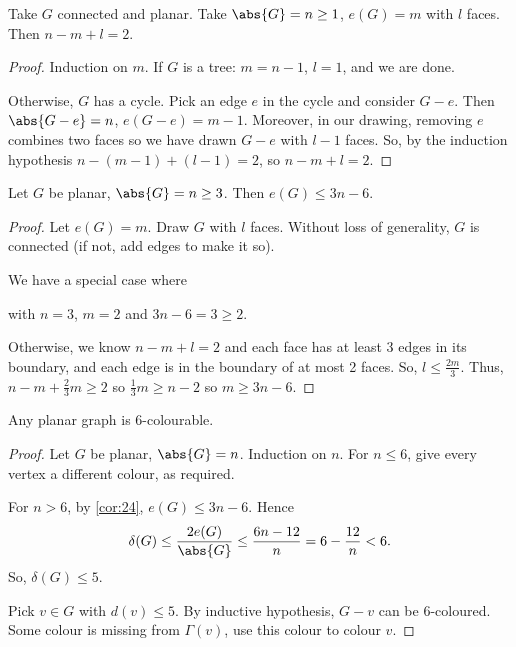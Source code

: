 \documentclass{article}
\begin{document}
\begin{nthm}\label{thm:23}
    Take $G$ connected and planar.
    Take $\abs{G} = n \geq 1$, $e(G) = m$ with $l$ faces.
    Then $n - m + l = 2$.
\end{nthm}
\begin{proof}
    Induction on $m$. If $G$ is a tree: $m = n-1$, $l = 1$, and we are done.

    Otherwise, $G$ has a cycle.
    Pick an edge $e$ in the cycle and consider $G-e$. Then $\abs{G - e} = n$, $e(G-e) = m-1$.
    Moreover, in our drawing, removing $e$ combines two faces so we have drawn $G-e$ with $l-1$ faces.
    So, by the induction hypothesis $n - (m-1) + (l-1) = 2$, so $n - m + l = 2$.
\end{proof}
\begin{ncor}\label{cor:24}
    Let $G$ be planar, $\abs{G} = n \geq 3$. Then $e(G) \leq 3n-6$.
\end{ncor}
\begin{proof}
    Let $e(G) = m$. Draw $G$ with $l$ faces.
    Without loss of generality, $G$ is connected (if not, add edges to make it so).

    We have a special case where
    \begin{center}
    \end{center}
    with $n = 3$, $m = 2$ and $3n-6 = 3 \geq 2$.

    Otherwise, we know $n - m + l = 2$ and each face has at least 3 edges in its boundary, and each edge is in the boundary of at most 2 faces.
    So, $l \leq \frac{2m}{3}$.
    Thus, $n -m + \frac{2}{3}m \geq 2$ so $\frac{1}{3}m \geq n-2$ so $m \geq 3n-6.$
\end{proof}
\begin{nprop}\label{prop:25}
    Any planar graph is 6-colourable.
\end{nprop}
\begin{proof}
    Let $G$ be planar, $\abs{G} = n$. Induction on $n$.
    For $n \leq 6$, give every vertex a different colour, as required.

    For $n > 6$, by \cref{cor:24}, $e(G) \leq 3n - 6$. Hence
    \begin{equation*}
        \delta(G) \leq \frac{2 e(G)}{\abs{G}} \leq \frac{6n-12}{n} = 6 - \frac{12}{n} < 6.
    \end{equation*}
    So, $\delta(G) \leq 5$.

    Pick $v \in G$ with $d(v) \leq 5$. By inductive hypothesis, $G- v$ can be 6-coloured.
    Some colour is missing from $\Gamma(v)$, use this colour to colour $v$.
\end{proof}
\end{document}

